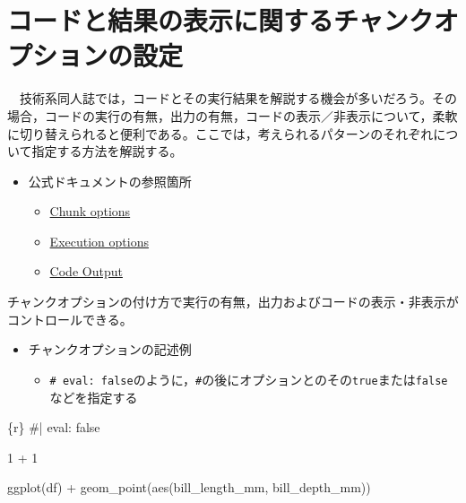 \documentclass[
  b5paper,
  xelatex, ja=standard]{bxjsbook}
\newenvironment{Shaded}{\begin{snugshade}}{\end{snugshade}}
\newcommand{\InformationTok}[1]{\textcolor[rgb]{0.37,0.37,0.37}{#1}}
\providecommand{\tightlist}{%
  \setlength{\itemsep}{0pt}\setlength{\parskip}{0pt}}\usepackage{longtable,booktabs,array}
\begin{document}
\section{コードと結果の表示に関するチャンクオプションの設定}\label{ux30b3ux30fcux30c9ux3068ux7d50ux679cux306eux8868ux793aux306bux95a2ux3059ux308bux30c1ux30e3ux30f3ux30afux30aaux30d7ux30b7ux30e7ux30f3ux306eux8a2dux5b9a}

　技術系同人誌では，コードとその実行結果を解説する機会が多いだろう。その場合，コードの実行の有無，出力の有無，コードの表示／非表示について，柔軟に切り替えられると便利である。ここでは，考えられるパターンのそれぞれについて指定する方法を解説する。

\begin{itemize}
\tightlist
\item
  公式ドキュメントの参照箇所

  \begin{itemize}
  \tightlist
  \item
    \href{https://r4ds.hadley.nz/quarto.html\#chunk-options}{Chunk
    options}
  \item
    \href{https://quarto.org/docs/reference/formats/html.html\#execution}{Execution
    options}
  \item
    \href{https://quarto.org/docs/reference/cells/cells-knitr.html\#code-output}{Code
    Output}
  \end{itemize}
\end{itemize}

チャンクオプションの付け方で実行の有無，出力およびコードの表示・非表示がコントロールできる。

\begin{itemize}
\tightlist
\item
  チャンクオプションの記述例

  \begin{itemize}
  \tightlist
  \item
    \texttt{\#\textbar{}\ eval:\ false}のように，\texttt{\#\textbar{}}の後にオプションとのその\texttt{true}または\texttt{false}などを指定する
  \end{itemize}
\end{itemize}

\begin{Shaded}
\begin{Highlighting}[]
\InformationTok{\textasciigrave{}\textasciigrave{}\textasciigrave{}\{r\}}
\InformationTok{\#| eval: false}

\InformationTok{1 + 1}

\InformationTok{ggplot(df) +}
\InformationTok{  geom\_point(aes(bill\_length\_mm, bill\_depth\_mm))}
\InformationTok{\textasciigrave{}\textasciigrave{}\textasciigrave{}}
\end{Highlighting}
\end{Shaded}
\end{document}
